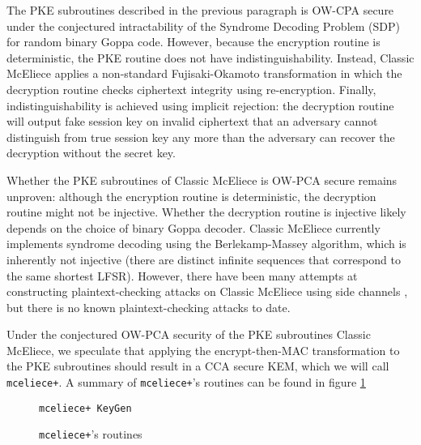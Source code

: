 \documentclass[runningheads]{llncs}
\begin{document}
The PKE subroutines described in the previous paragraph is OW-CPA secure under the conjectured intractability of the Syndrome Decoding Problem (SDP) for random binary Goppa code. However, because the encryption routine is deterministic, the PKE routine does not have indistinguishability. Instead, Classic McEliece applies a non-standard Fujisaki-Okamoto transformation in which the decryption routine checks ciphertext integrity using re-encryption. Finally, indistinguishability is achieved using implicit rejection: the decryption routine will output fake session key on invalid ciphertext that an adversary cannot distinguish from true session key any more than the adversary can recover the decryption without the secret key.

Whether the PKE subroutines of Classic McEliece is OW-PCA secure remains unproven: although the encryption routine is deterministic, the decryption routine might not be injective. Whether the decryption routine is injective likely depends on the choice of binary Goppa decoder. Classic McEliece currently implements syndrome decoding using the Berlekamp-Massey algorithm, which is inherently not injective (there are distinct infinite sequences that correspond to the same shortest LFSR). However, there have been many attempts at constructing plaintext-checking attacks on Classic McEliece using side channels \cite{ueno2022curse}\cite{DBLP:journals/tches/TanakaUXITH23}, but there is no known plaintext-checking attacks to date.

Under the conjectured OW-PCA security of the PKE subroutines Classic McEliece, we speculate that applying the encrypt-then-MAC transformation to the PKE subroutines should result in a CCA secure KEM, which we will call \texttt{mceliece+}. A summary of \texttt{mceliece+}'s routines can be found in figure \ref{fig:mceliece-plus-routines}

\begin{figure}[H]
    \centering
    \begin{algorithm}[H]
        \caption*{\texttt{mceliece+ KeyGen}}
        \begin{algorithmic}
            \State 
        \end{algorithmic}
    \end{algorithm}
    \caption{\texttt{mceliece+}'s routines}\label{fig:mceliece-plus-routines}
\end{figure}
\end{document}
